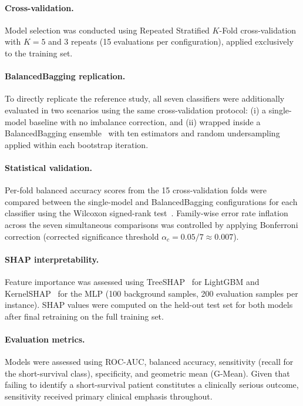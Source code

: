 \documentclass[a4paper,twoside]{article}
\begin{document}
\paragraph{Cross-validation.}
Model selection was conducted using Repeated Stratified $K$-Fold
cross-validation with $K = 5$ and 3 repeats (15 evaluations per configuration),
applied exclusively to the training set.

\paragraph{BalancedBagging replication.}
To directly replicate the reference study, all seven classifiers were additionally
evaluated in two scenarios using the same cross-validation protocol: (i) a
single-model baseline with no imbalance correction, and (ii) wrapped inside a
BalancedBagging ensemble~\cite{lemaitre2017} with ten estimators and random
undersampling applied within each bootstrap iteration.

\paragraph{Statistical validation.}
Per-fold balanced accuracy scores from the 15 cross-validation folds were compared
between the single-model and BalancedBagging configurations for each classifier
using the Wilcoxon signed-rank test~\cite{wilcoxon1945}. Family-wise error rate
inflation across the seven simultaneous comparisons was controlled by applying
Bonferroni correction (corrected significance threshold
$\alpha_c = 0.05 / 7 \approx 0.007$).

\paragraph{SHAP interpretability.}
Feature importance was assessed using TreeSHAP~\cite{lundberg2020treeshap} for
LightGBM and KernelSHAP~\cite{lundberg2017shap} for the MLP (100 background
samples, 200 evaluation samples per instance). SHAP values were computed on the
held-out test set for both models after final retraining on the full training set.

\paragraph{Evaluation metrics.}
Models were assessed using ROC-AUC, balanced accuracy, sensitivity (recall for
the short-survival class), specificity, and geometric mean (G-Mean). Given that
failing to identify a short-survival patient constitutes a clinically serious
outcome, sensitivity received primary clinical emphasis throughout.
\end{document}
